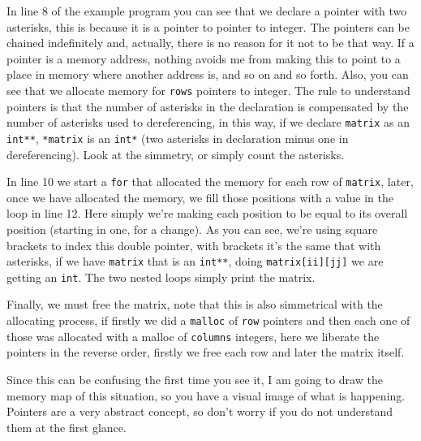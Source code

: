 \documentclass[a4paper]{article}
\begin{document}
In line 8 of the example program you can see that we declare a pointer with two
asterisks, this is because it is a pointer to pointer to integer. The pointers
can be chained indefinitely and, actually, there is no reason for it not to be
that way. If a pointer is a memory address, nothing avoids me from making this
to point to a place in memory where another address is, and so on and so forth.
Also, you can see that we allocate memory for \verb!rows! pointers to integer.
The rule to understand pointers is that the number of asterisks in the
declaration is compensated by the number of asterisks used to dereferencing, in
this way, if we declare \verb!matrix! as an \verb!int**!, \verb!*matrix! is
an \verb!int*! (two asterisks in declaration minus one in dereferencing).
Look at the simmetry, or simply count the asterisks.

In line 10 we start a \verb!for! that allocated the memory for each row of
\verb!matrix!, later, once we have allocated the memory, we fill those positions
with a value in the loop in line 12. Here simply we're making each position to
be equal to its overall position (starting in one, for a change). As you
can see, we're using square brackets to index this double pointer, with brackets
it's the same that with asterisks, if we have \verb!matrix! that is an
\verb!int**!, doing \verb!matrix[ii][jj]! we are getting an \verb"int". The two
nested loops simply print the matrix.

Finally, we must free the matrix, note that this is also simmetrical with the
allocating process, if firstly we did a \verb!malloc! of \verb!row! pointers and
then each one of those was allocated with a malloc of \verb!columns! integers,
here we liberate the pointers in the reverse order, firstly we free each row and
later the matrix itself.

Since this can be confusing the first time you see it, I am going to draw the
memory map of this situation, so you have a visual image of what is happening.
Pointers are a very abstract concept, so don't worry if you do not understand
them at the first glance.
\end{document}
